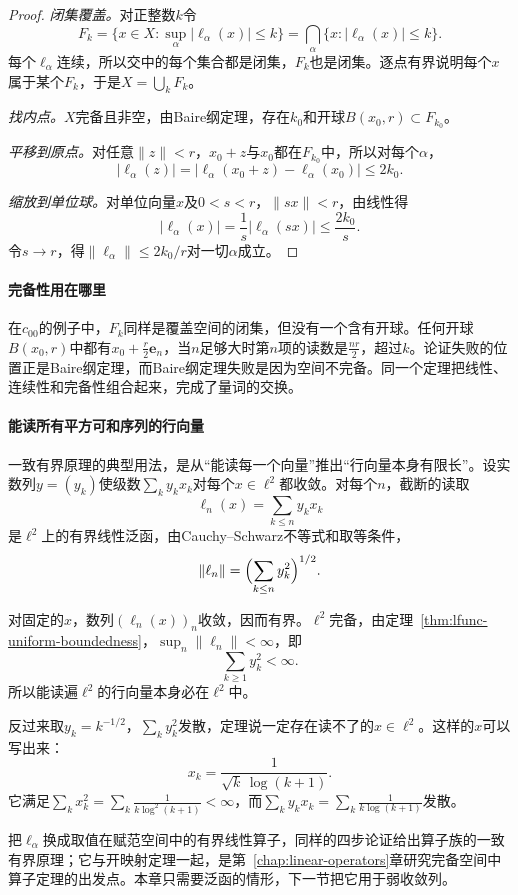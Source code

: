 \begin{proof}
\emph{闭集覆盖。}对正整数$k$令
\[
F_k=\{x\in X:\sup_\alpha\lvert\ell_\alpha(x)\rvert\leq k\}=\bigcap_\alpha\{x:\lvert\ell_\alpha(x)\rvert\leq k\}.
\]
每个$\ell_\alpha$连续，所以交中的每个集合都是闭集，$F_k$也是闭集。逐点有界说明每个$x$属于某个$F_k$，于是$X=\bigcup_kF_k$。

\emph{找内点。}$X$完备且非空，由Baire纲定理，存在$k_0$和开球$B(x_0,r)\subset F_{k_0}$。

\emph{平移到原点。}对任意$\lVert z\rVert<r$，$x_0+z$与$x_0$都在$F_{k_0}$中，所以对每个$\alpha$，
\[
\lvert\ell_\alpha(z)\rvert=\lvert\ell_\alpha(x_0+z)-\ell_\alpha(x_0)\rvert\leq2k_0 .
\]

\emph{缩放到单位球。}对单位向量$x$及$0<s<r$，$\lVert sx\rVert<r$，由线性得
\[
\lvert\ell_\alpha(x)\rvert=\frac1s\lvert\ell_\alpha(sx)\rvert\leq\frac{2k_0}{s} .
\]
令$s\to r$，得$\lVert\ell_\alpha\rVert\leq2k_0/r$对一切$\alpha$成立。
\end{proof}

\paragraph{完备性用在哪里}
在$c_{00}$的例子中，$F_k$同样是覆盖空间的闭集，但没有一个含有开球。任何开球$B(x_0,r)$中都有$x_0+\frac r2\bm e_n$，当$n$足够大时第$n$项的读数是$\frac{nr}{2}$，超过$k$。论证失败的位置正是Baire纲定理，而Baire纲定理失败是因为空间不完备。同一个定理把线性、连续性和完备性组合起来，完成了量词的交换。

\paragraph{能读所有平方可和序列的行向量}
一致有界原理的典型用法，是从“能读每一个向量”推出“行向量本身有限长”。设实数列$y=(y_k)$使级数$\sum_ky_kx_k$对每个$x\in\ell^2$都收敛。对每个$n$，截断的读取
\[
\ell_n(x)=\sum_{k\leq n}y_kx_k
\]
是$\ell^2$上的有界线性泛函，由Cauchy--Schwarz不等式和取等条件，
\[
\lVert\ell_n\rVert=\Bigl(\sum_{k\leq n}y_k^2\Bigr)^{1/2} .
\]

对固定的$x$，数列$(\ell_n(x))_n$收敛，因而有界。$\ell^2$完备，由定理~\ref{thm:lfunc-uniform-boundedness}，$\sup_n\lVert\ell_n\rVert<\infty$，即
\[
\sum_{k\geq1}y_k^2<\infty .
\]
所以能读遍$\ell^2$的行向量本身必在$\ell^2$中。

反过来取$y_k=k^{-1/2}$，$\sum_ky_k^2$发散，定理说一定存在读不了的$x\in\ell^2$。这样的$x$可以写出来：
\[
x_k=\frac{1}{\sqrt k\,\log(k+1)} .
\]
它满足$\sum_kx_k^2=\sum_k\frac1{k\log^2(k+1)}<\infty$，而$\sum_ky_kx_k=\sum_k\frac{1}{k\log(k+1)}$发散。

把$\ell_\alpha$换成取值在赋范空间中的有界线性算子，同样的四步论证给出算子族的一致有界原理；它与开映射定理一起，是第~\ref{chap:linear-operators}章研究完备空间中算子定理的出发点。本章只需要泛函的情形，下一节把它用于弱收敛列。

